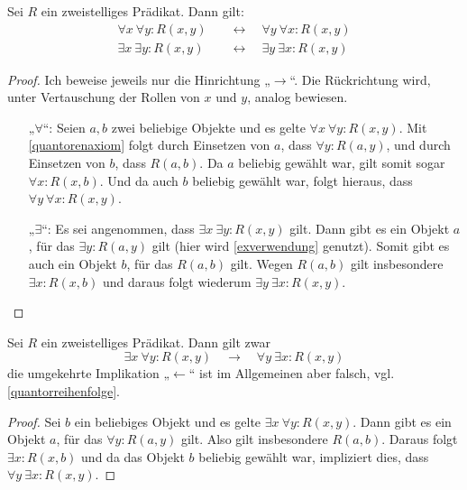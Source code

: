 \begin{satz} \label{quantorentausch}
    Sei $R$ ein zweistelliges Prädikat. Dann gilt:
    \begin{align*}
        \forall x\ \forall y: R(x,y) \quad &\leftrightarrow\quad \forall y\ \forall x: R(x,y) \\
        \exists x\ \exists y: R(x,y) \quad &\leftrightarrow\quad  \exists y\ \exists x: R(x,y)
    \end{align*}
\end{satz}
\begin{proof}
    Ich beweise jeweils nur die Hinrichtung „$\to$“. Die Rückrichtung wird, unter Vertauschung der Rollen von $x$ und $y$, analog bewiesen.
    \begin{itemize}
        \item[„$\forall$“:] Seien $a,b$ zwei beliebige Objekte und es gelte $\forall x\ \forall y: R(x,y)$. Mit \cref{quantorenaxiom} folgt durch Einsetzen von $a$, dass $\forall y: R(a,y)$, und durch Einsetzen von $b$, dass $R(a,b)$. Da $a$ beliebig gewählt war, gilt somit sogar $\forall x: R(x,b)$. Und da auch $b$ beliebig gewählt war, folgt hieraus, dass $\forall y\ \forall x: R(x,y)$.
        \item[„$\exists$“:] Es sei angenommen, dass $\exists x\ \exists y: R(x,y)$ gilt. Dann gibt es ein Objekt $a$, für das $\exists y: R(a,y)$ gilt (hier wird \cref{exverwendung} genutzt). Somit gibt es auch ein Objekt $b$, für das $R(a,b)$ gilt. Wegen $R(a,b)$ gilt insbesondere $\exists x: R(x,b)$ und daraus folgt wiederum $\exists y\ \exists x: R(x,y)$. \qedhere
    \end{itemize}
\end{proof}


\begin{satz}
    Sei $R$ ein zweistelliges Prädikat. Dann gilt zwar
        \[ \exists x\ \forall y: R(x,y) \quad\to\quad \forall y\ \exists x: R(x,y) \]  
    die umgekehrte Implikation „$\leftarrow$“ ist im Allgemeinen aber falsch, vgl. \cref{quantorreihenfolge}.
\end{satz}
\begin{proof}
    Sei $b$ ein beliebiges Objekt und es gelte $\exists x\ \forall y: R(x,y)$. Dann gibt es ein Objekt $a$, für das $\forall y: R(a,y)$ gilt. Also gilt insbesondere $R(a,b)$. Daraus folgt $\exists x: R(x,b)$ und da das Objekt $b$ beliebig gewählt war, impliziert dies, dass $\forall y\ \exists x: R(x,y)$.
\end{proof}





